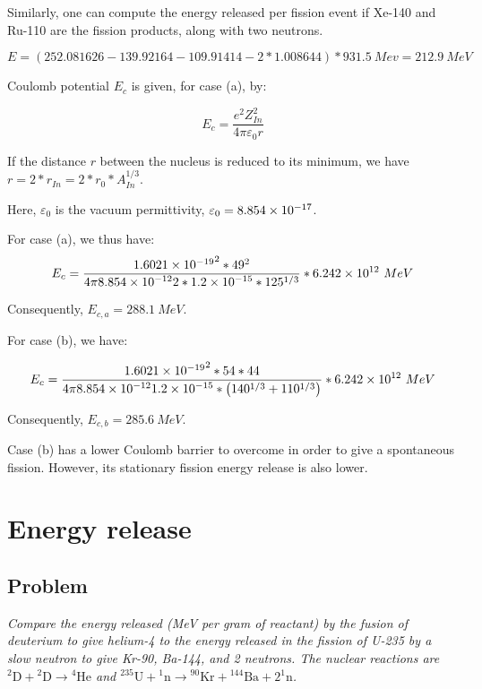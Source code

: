 Similarly, one can compute the energy released per fission event if Xe-140 and Ru-110 are the fission products, along with two neutrons.

\begin{equation}
E = (252.081626 - 139.92164 - 109.91414 - 2*1.008644) * 931.5\ {Mev} = 212.9\ {MeV}
\end{equation}


Coulomb potential $E_c$ is given, for case (a), by:

\begin{equation}
E_c = \frac{e^2Z_{In}^2}{4\pi \varepsilon_0 r}
\end{equation}

If the distance $r$ between the nucleus is reduced to its minimum, we have $r = 2*r_{In} = 2*r_0*A_{In}^{1/3}$.

Here, $\varepsilon_0$ is the vacuum permittivity, $\varepsilon_0 = \text{\num{8.854e-17}}$.

For case (a), we thus have:
\begin{equation}
E_c = \frac{\text{\num{1.6021e-19}}^2 * 49^2}{4\pi \text{\num{8.854e-12}} 2*\text{\num{1.2e-15}}*125^{1/3}} * \text{\num{6.242e12}}\ {MeV}
\end{equation}

Consequently, $E_{c,a} = 288.1\ {MeV}$.

For case (b), we have:

\begin{equation}
E_c = \frac{\text{\num{1.6021e-19}}^2 * 54 * 44}{4\pi \text{\num{8.854e-12}} \text{\num{1.2e-15}}*\left( 140^{1/3} + 110^{1/3} \right)} * \text{\num{6.242e12}}\ {MeV}
\end{equation}

Consequently, $E_{c,b} = 285.6\ {MeV}$.

Case (b) has a lower Coulomb barrier to overcome in order to give a spontaneous fission. However, its stationary fission energy release is also lower.


\section{Energy release}
\label{prob13}


\subsection{Problem}
\textit{Compare the energy released (MeV per gram of reactant) by the fusion of deuterium to give helium-4 to the energy released in the fission of U-235 by a slow neutron to give Kr-90, Ba-144, and 2 neutrons. The nuclear reactions are ${}^2\textrm{D} + {}^2\textrm{D} \to {}^{4}\textrm{He}$ and ${}^{235}\textrm{U} + {}^1\textrm{n} \to {}^{90}\textrm{Kr} + {}^{144}\textrm{Ba} + 2{}^1\textrm{n}$.}

